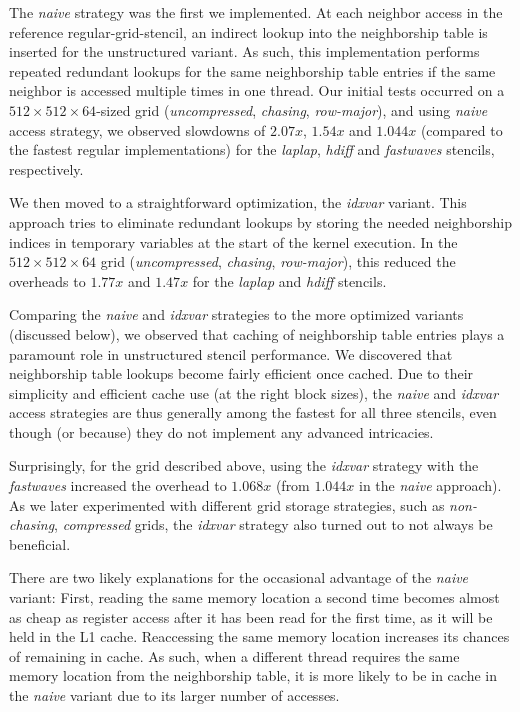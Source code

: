 The \emph{naive} strategy was the first we implemented. At each neighbor access in the reference regular-grid-stencil, an indirect lookup into the neighborship table is inserted for the unstructured variant. As such, this implementation performs repeated redundant lookups for the same neighborship table entries if the same neighbor is accessed multiple times in one thread. Our initial tests occurred on a $512\times 512\times 64$-sized grid (\emph{uncompressed}, \emph{chasing}, \emph{row-major}), and using \emph{naive} access strategy, we observed slowdowns of $2.07x$, $1.54x$ and $1.044x$ (compared to the fastest regular implementations) for the \emph{laplap}, \emph{hdiff} and \emph{fastwaves} stencils, respectively.

We then moved to a straightforward optimization, the \emph{idxvar} variant. This approach tries to eliminate redundant lookups by storing the needed neighborship indices in temporary variables at the start of the kernel execution. In the $512\times 512\times 64$ grid (\emph{uncompressed}, \emph{chasing}, \emph{row-major}), this reduced the overheads to $1.77x$ and $1.47x$ for the \emph{laplap} and \emph{hdiff} stencils.

Comparing the \emph{naive} and \emph{idxvar} strategies to the more optimized variants (discussed below), we observed that caching of neighborship table entries plays a paramount role in unstructured stencil performance. We discovered that neighborship table lookups become fairly efficient once cached. Due to their simplicity and efficient cache use (at the right block sizes), the \emph{naive} and \emph{idxvar} access strategies are thus generally among the fastest for all three stencils, even though (or because) they do not implement any advanced intricacies.

Surprisingly, for the grid described above, using the \emph{idxvar} strategy with the \emph{fastwaves} increased the overhead to $1.068x$ (from $1.044x$ in the \emph{naive} approach). As we later experimented with different grid storage strategies, such as \emph{non-chasing}, \emph{compressed} grids, the \emph{idxvar} strategy also turned out to not always be beneficial.

There are two likely explanations for the occasional advantage of the \emph{naive} variant: First, reading the same memory location a second time becomes almost as cheap as register access after it has been read for the first time, as it will be held in the L1 cache. Reaccessing the same memory location increases its chances of remaining in cache. As such, when a different thread requires the same memory location from the neighborship table, it is more likely to be in cache in the \emph{naive} variant due to its larger number of accesses.

